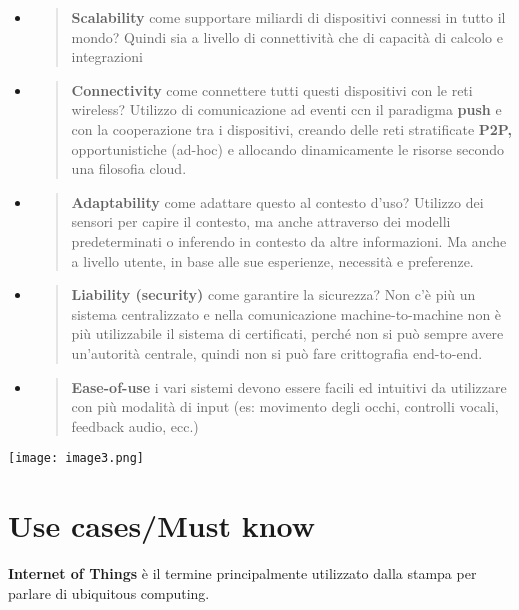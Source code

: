 \begin{itemize}
\item
  \begin{quote}
  \textbf{Scalability} come supportare miliardi di dispositivi connessi
  in tutto il mondo? Quindi sia a livello di connettività che di
  capacità di calcolo e integrazioni
  \end{quote}
\item
  \begin{quote}
  \textbf{Connectivity} come connettere tutti questi dispositivi con le
  reti wireless? Utilizzo di comunicazione ad eventi ccn il paradigma
  \textbf{push} e con la cooperazione tra i dispositivi, creando delle
  reti stratificate \textbf{P2P,} opportunistiche (ad-hoc) e allocando
  dinamicamente le risorse secondo una filosofia cloud.
  \end{quote}
\item
  \begin{quote}
  \textbf{Adaptability} come adattare questo al contesto d'uso? Utilizzo
  dei sensori per capire il contesto, ma anche attraverso dei modelli
  predeterminati o inferendo in contesto da altre informazioni. Ma anche
  a livello utente, in base alle sue esperienze, necessità e preferenze.
  \end{quote}
\item
  \begin{quote}
  \textbf{Liability (security)} come garantire la sicurezza? Non c'è più
  un sistema centralizzato e nella comunicazione machine-to-machine non
  è più utilizzabile il sistema di certificati, perché non si può sempre
  avere un'autorità centrale, quindi non si può fare crittografia
  end-to-end.
  \end{quote}
\item
  \begin{quote}
  \textbf{Ease-of-use} i vari sistemi devono essere facili ed intuitivi
  da utilizzare con più modalità di input (es: movimento degli occhi,
  controlli vocali, feedback audio, ecc.)
  \end{quote}
\end{itemize}

\texttt{[image: image3.png]}

\section{Use cases/Must know}\label{use-casesmust-know}

\textbf{Internet of Things} è il termine principalmente utilizzato dalla
stampa per parlare di ubiquitous computing.

